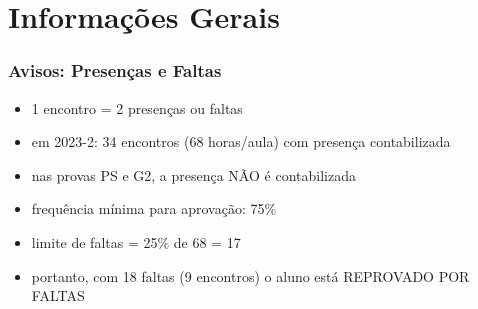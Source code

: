 \documentclass[aspectratio=169]{beamer}
\begin{document}

\section{Informa\c{c}\~oes Gerais}

\begin{frame}\frametitle{Avisos: Presenças e Faltas}
\begin{itemize}
	\item 1 encontro = 2 presen\c{c}as ou faltas
	\item em 2023-2: 34 encontros (68 horas/aula) com presença contabilizada
	\item nas provas PS e G2, a presença NÃO é contabilizada
	\item frequ\^encia m\'inima para aprova\c{c}\~ao: 75\%
	\item limite de faltas = 25\% de 68 = 17
	\item portanto, com 18 faltas (9 encontros) o aluno está REPROVADO POR FALTAS
\end{itemize}
\end{frame}
\end{document}
